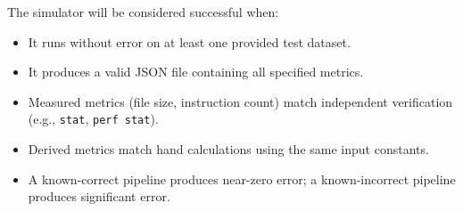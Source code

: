 \documentclass{article}
\begin{document}
The simulator will be considered successful when:

\begin{itemize}
    \item It runs without error on at least one provided test dataset.
    \item It produces a valid JSON file containing all specified metrics.
    \item Measured metrics (file size, instruction count) match independent verification
          (e.g., \verb|stat|, \verb|perf stat|).
    \item Derived metrics match hand calculations using the same input constants.
    \item A known-correct pipeline produces near-zero error; a known-incorrect pipeline produces significant error.
\end{itemize}
\end{document}
